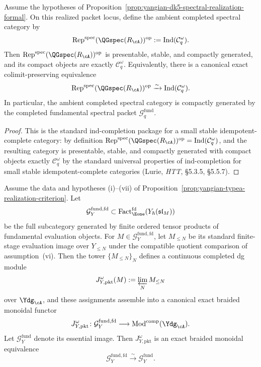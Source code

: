\begin{corollary}
\label{cor:yangian-dk5-spectral-packet-ind}
Assume the hypotheses of
Proposition~\ref{prop:yangian-dk5-spectral-realization-formal}. On
this realized packet locus, define the ambient completed spectral
category by
\[
\operatorname{Rep}^{\mathrm{spec}}(\QGspec(R_{\cA}))^{\mathrm{op}}
:=
\operatorname{Ind}(\mathcal{C}_q^\omega).
\]
Then
\(\operatorname{Rep}^{\mathrm{spec}}(\QGspec(R_{\cA}))^{\mathrm{op}}\)
is presentable, stable, and compactly generated, and its compact
objects are exactly \(\mathcal{C}_q^\omega\). Equivalently, there is a
canonical exact colimit-preserving equivalence
\[
\operatorname{Rep}^{\mathrm{spec}}(\QGspec(R_{\cA}))^{\mathrm{op}}
\xrightarrow{\sim}
\operatorname{Ind}(\mathcal{C}_q^\omega).
\]
In particular, the ambient completed spectral category is compactly
generated by the completed fundamental spectral packet
\(\mathcal{G}^{\mathrm{fund}}_{q}\).
\end{corollary}

\begin{proof}
This is the standard ind-completion package for a small stable
idempotent-complete category: by definition
\(\operatorname{Rep}^{\mathrm{spec}}(\QGspec(R_{\cA}))^{\mathrm{op}}
= \operatorname{Ind}(\mathcal{C}_q^\omega)\), and the resulting
category is presentable, stable, and compactly generated with compact
objects exactly \(\mathcal{C}_q^\omega\) by the standard universal
properties of ind-completion for small stable idempotent-complete
categories \textup{(}Lurie, \emph{HTT}, \S5.3.5, \S5.5.7\textup{)}.
\end{proof}

\begin{proposition}
\label{prop:yangian-dg-fundamental-packet-realization}
Assume the data and hypotheses \textup{(i)}--\textup{(vii)} of
Proposition~\ref{prop:yangian-typea-realization-criterion}. Let
\[
\mathcal{G}^{\mathrm{fund,fd}}_{Y}
\subset
\operatorname{Fact}_{\Eone}^{\mathrm{fd}}(Y_\hbar(\mathfrak{sl}_M))
\]
be the full subcategory generated by finite ordered tensor products of
fundamental evaluation objects. For
\(M\in\mathcal{G}^{\mathrm{fund,fd}}_{Y}\), let \(M_{\le N}\) be its
standard finite-stage evaluation image over \(Y_{\le N}\) under the
compatible quotient comparison of
assumption~\textup{(vi)}. Then the tower \(\{M_{\le N}\}_N\) defines a
continuous completed dg module
\[
J_{Y,\mathrm{pkt}}^\omega(M)
:=
\varprojlim_N M_{\le N}
\]
over \(\Ydg_{\cA}\), and these assignments assemble into a canonical
exact braided monoidal functor
\[
J_{Y,\mathrm{pkt}}^\omega\colon
\mathcal{G}^{\mathrm{fund,fd}}_{Y}
\longrightarrow
\operatorname{Mod}^{\mathrm{comp}}(\Ydg_{\cA}).
\]
Let \(\mathcal{G}^{\mathrm{fund}}_{Y}\) denote its essential image.
Then \(J_{Y,\mathrm{pkt}}^\omega\) is an exact braided monoidal
equivalence
\[
\mathcal{G}^{\mathrm{fund,fd}}_{Y}
\xrightarrow{\sim}
\mathcal{G}^{\mathrm{fund}}_{Y}.
\]

\end{proposition}

